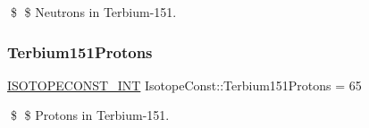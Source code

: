 \$ \$ Neutrons in Terbium-\/151. \mbox{\label{group___isotope_const-_terbium-_tb151_ga0c5f8e01024fb2f6fb5b59c03bc5f11c}} 
\subsubsection{\texorpdfstring{Terbium151\+Protons}{Terbium151Protons}}
{\footnotesize\ttfamily \mbox{\hyperlink{group___isotope_const-_macros_ga5f18360b3e99483a35c32d789e62621c}{I\+S\+O\+T\+O\+P\+E\+C\+O\+N\+S\+T\+\_\+\+I\+NT}} Isotope\+Const\+::\+Terbium151\+Protons = 65}

\$ \$ Protons in Terbium-\/151. 
